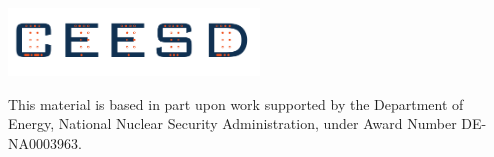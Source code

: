 \documentclass{beamer}
\begin{document}
\begin{frame}\frametitle{}
  \vspace*{0.2in}
  
\begin{center}
\includegraphics[width=0.5\textwidth]{ceesd-logo-2.pdf}\\

\vspace*{0.35in}

\vspace*{0.5in}
\begin{minipage}{0.8\textwidth}
This material is based in part upon work supported by the Department of Energy, National Nuclear Security Administration, under Award Number DE-NA0003963. 
\end{minipage}
\end{center}
\end{frame}
\end{document}
